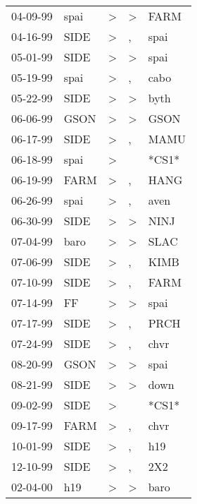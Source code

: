 \begin{supertabular}{lllll}
 04-09-99 &   spai &     \textgreater &     \textgreater &   FARM \\
 04-16-99 &   SIDE &     \textgreater &                , &   spai \\
 05-01-99 &   SIDE &     \textgreater &     \textgreater &   spai \\
 05-19-99 &   spai &     \textgreater &                , &   cabo \\
 05-22-99 &   SIDE &     \textgreater &     \textgreater &   byth \\
 06-06-99 &   GSON &     \textgreater &     \textgreater &   GSON \\
 06-17-99 &   SIDE &     \textgreater &                , &   MAMU \\
 06-18-99 &   spai &     \textgreater &                  &  *CS1* \\
 06-19-99 &   FARM &     \textgreater &                , &   HANG \\
 06-26-99 &   spai &     \textgreater &                , &   aven \\
 06-30-99 &   SIDE &     \textgreater &     \textgreater &   NINJ \\
 07-04-99 &   baro &     \textgreater &     \textgreater &   SLAC \\
 07-06-99 &   SIDE &     \textgreater &                , &   KIMB \\
 07-10-99 &   SIDE &     \textgreater &                , &   FARM \\
 07-14-99 &     FF &     \textgreater &     \textgreater &   spai \\
 07-17-99 &   SIDE &     \textgreater &                , &   PRCH \\
 07-24-99 &   SIDE &     \textgreater &                , &   chvr \\
 08-20-99 &   GSON &     \textgreater &     \textgreater &   spai \\
 08-21-99 &   SIDE &     \textgreater &     \textgreater &   down \\
 09-02-99 &   SIDE &     \textgreater &                  &  *CS1* \\
 09-17-99 &   FARM &     \textgreater &                , &   chvr \\
 10-01-99 &   SIDE &     \textgreater &                , &    h19 \\
 12-10-99 &   SIDE &     \textgreater &                , &    2X2 \\
 02-04-00 &    h19 &     \textgreater &     \textgreater &   baro \\

\end{supertabular}
